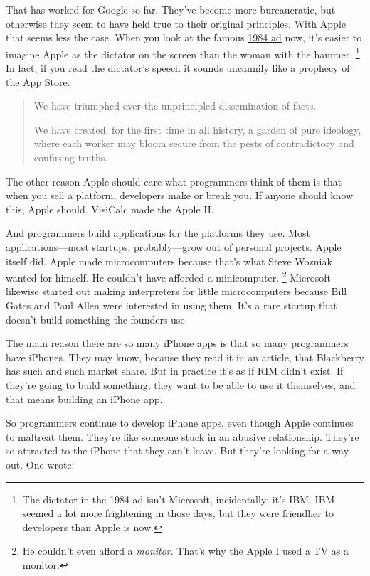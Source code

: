 \documentclass[12pt]{book}
\begin{document}
That has worked for Google so far. They've become more bureaucratic, but
otherwise they seem to have held true to their original principles. With
Apple that seems less the case. When you look at the famous
\href{http://www.uriahcarpenter.info/1984.html}{1984 ad} now, it's
easier to imagine Apple as the dictator on the screen than the woman
with the hammer. \footnote{The dictator in the 1984 ad isn't Microsoft, incidentally; it's
IBM. IBM seemed a lot more frightening in those days, but they were
friendlier to developers than Apple is now.} In fact, if you read the
dictator's speech it sounds uncannily like a prophecy of the App Store.

\begin{quote}
We have triumphed over the unprincipled dissemination of facts.

We have created, for the first time in all history, a garden of pure
ideology, where each worker may bloom secure from the pests of
contradictory and confusing truths.
\end{quote}

The other reason Apple should care what programmers think of them is
that when you sell a platform, developers make or break you. If anyone
should know this, Apple should. VisiCalc made the Apple II.

And programmers build applications for the platforms they use. Most
applications---most startups, probably---grow out of personal projects.
Apple itself did. Apple made microcomputers because that's what Steve
Wozniak wanted for himself. He couldn't have afforded a minicomputer.
\footnote{He couldn't even afford a \emph{monitor}. That's why the Apple I
used a TV as a monitor.} Microsoft likewise started out making
interpreters for little microcomputers because Bill Gates and Paul Allen
were interested in using them. It's a rare startup that doesn't build
something the founders use.

The main reason there are so many iPhone apps is that so many
programmers have iPhones. They may know, because they read it in an
article, that Blackberry has such and such market share. But in practice
it's as if RIM didn't exist. If they're going to build something, they
want to be able to use it themselves, and that means building an iPhone
app.

So programmers continue to develop iPhone apps, even though Apple
continues to maltreat them. They're like someone stuck in an abusive
relationship. They're so attracted to the iPhone that they can't leave.
But they're looking for a way out. One wrote:
\end{document}
